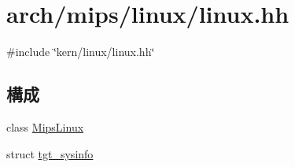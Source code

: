 \hypertarget{arch_2mips_2linux_2linux_8hh}{
\section{arch/mips/linux/linux.hh}
\label{arch_2mips_2linux_2linux_8hh}
}
{\ttfamily \#include \char`\"{}kern/linux/linux.hh\char`\"{}}\par
\subsection*{構成}
\begin{DoxyCompactItemize}
\item 
class \hyperlink{classMipsLinux}{MipsLinux}
\item 
struct \hyperlink{structMipsLinux_1_1tgt__sysinfo}{tgt\_\-sysinfo}
\end{DoxyCompactItemize}
